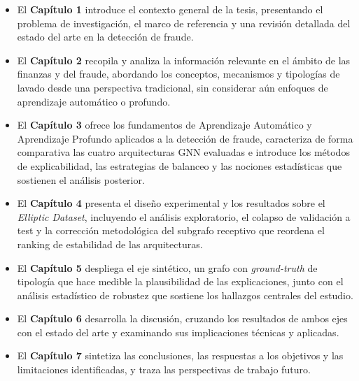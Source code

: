 \begin{itemize}
    \item El \textbf{Capítulo 1} introduce el contexto general de la tesis, presentando el problema de investigación, el marco de referencia y una revisión detallada del estado del arte en la detección de fraude.
    \item El \textbf{Capítulo 2} recopila y analiza la información relevante en el ámbito de las finanzas y del fraude, abordando los conceptos, mecanismos y tipologías de lavado desde una perspectiva tradicional, sin considerar aún enfoques de aprendizaje automático o profundo.
    \item El \textbf{Capítulo 3} ofrece los fundamentos de Aprendizaje Automático y Aprendizaje Profundo aplicados a la detección de fraude, caracteriza de forma comparativa las cuatro arquitecturas GNN evaluadas e introduce los métodos de explicabilidad, las estrategias de balanceo y las nociones estadísticas que sostienen el análisis posterior.
    \item El \textbf{Capítulo 4} presenta el diseño experimental y los resultados sobre el \textit{Elliptic Dataset}, incluyendo el análisis exploratorio, el colapso de validación a test y la corrección metodológica del subgrafo receptivo que reordena el ranking de estabilidad de las arquitecturas.
    \item El \textbf{Capítulo 5} despliega el eje sintético, un grafo con \textit{ground-truth} de tipología que hace medible la plausibilidad de las explicaciones, junto con el análisis estadístico de robustez que sostiene los hallazgos centrales del estudio.
    \item El \textbf{Capítulo 6} desarrolla la discusión, cruzando los resultados de ambos ejes con el estado del arte y examinando sus implicaciones técnicas y aplicadas.
    \item El \textbf{Capítulo 7} sintetiza las conclusiones, las respuestas a los objetivos y las limitaciones identificadas, y traza las perspectivas de trabajo futuro.
\end{itemize}
